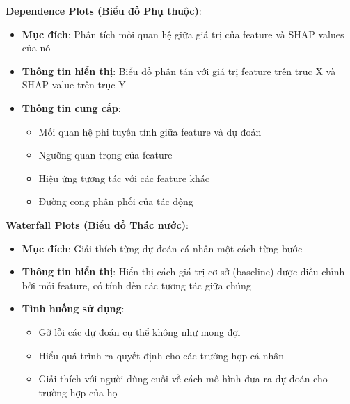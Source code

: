 \textbf{Dependence Plots (Biểu đồ Phụ thuộc)}:
\begin{itemize}[leftmargin=*]
    \item \textbf{Mục đích}: Phân tích mối quan hệ giữa giá trị của feature và SHAP values của nó
    
    \item \textbf{Thông tin hiển thị}: Biểu đồ phân tán với giá trị feature trên trục X và SHAP value trên trục Y
    
    \item \textbf{Thông tin cung cấp}: 
    \begin{itemize}[leftmargin=*]
        \item Mối quan hệ phi tuyến tính giữa feature và dự đoán
        \item Ngưỡng quan trọng của feature
        \item Hiệu ứng tương tác với các feature khác
        \item Đường cong phân phối của tác động
    \end{itemize}
\end{itemize}

\textbf{Waterfall Plots (Biểu đồ Thác nước)}:
\begin{itemize}[leftmargin=*]
    \item \textbf{Mục đích}: Giải thích từng dự đoán cá nhân một cách từng bước
    
    \item \textbf{Thông tin hiển thị}: Hiển thị cách giá trị cơ sở (baseline) được điều chỉnh bởi mỗi feature, có tính đến các tương tác giữa chúng
    
    \item \textbf{Tình huống sử dụng}: 
    \begin{itemize}[leftmargin=*]
        \item Gỡ lỗi các dự đoán cụ thể không như mong đợi
        \item Hiểu quá trình ra quyết định cho các trường hợp cá nhân
        \item Giải thích với người dùng cuối về cách mô hình đưa ra dự đoán cho trường hợp của họ
    \end{itemize}
\end{itemize}

